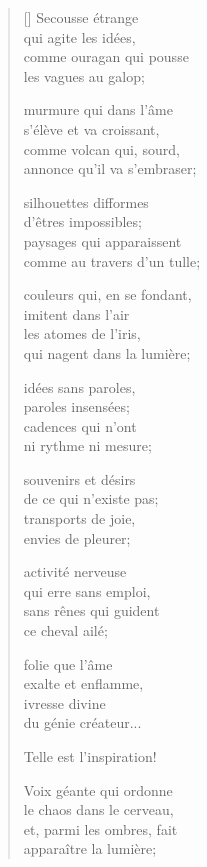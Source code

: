 \documentclass[a4paper,12pt]{book}
\begin{document}
\settowidth{\versewidth}{comme au travers d'un tulle,}

\begin{verse}[\versewidth]
  Secousse étrange \\
  qui agite les idées, \\
  comme ouragan qui pousse \\
  les vagues au galop;

  murmure qui dans l'âme \\
  s'élève et va croissant, \\
  comme volcan qui, sourd, \\
  annonce qu'il va s'embraser;

  silhouettes difformes \\
  d'êtres impossibles; \\
  paysages qui apparaissent \\
  comme au travers d'un tulle;

  couleurs qui, en se fondant, \\
  imitent dans l'air \\
  les atomes de l'iris, \\
  qui nagent dans la lumière;

  idées sans paroles, \\
  paroles insensées; \\
  cadences qui n'ont \\
  ni rythme ni mesure;

  souvenirs et désirs \\
  de ce qui n'existe pas; \\
  transports de joie, \\
  envies de pleurer;

  activité nerveuse \\
  qui erre sans emploi, \\
  sans rênes qui guident \\
  ce cheval ailé;

  folie que l'âme \\
  exalte et enflamme, \\
  ivresse divine \\
  du génie créateur...

  Telle est l'inspiration!

  Voix géante qui ordonne \\
  le chaos dans le cerveau, \\
  et, parmi les ombres, fait \\
  apparaître la lumière;


\end{verse}
\end{document}
